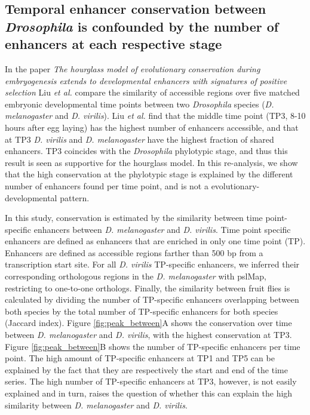 \subsection{Temporal enhancer conservation between \textit{Drosophila} is confounded by the number of enhancers at each respective stage} \label{subsection:liu}

In the paper \textit{The hourglass model of evolutionary conservation during embryogenesis extends to developmental enhancers with signatures of positive selection}\cite{Liu2021} Liu \textit{et al.} compare the similarity of accessible regions over five matched embryonic developmental time points between two \textit{Drosophila} species (\textit{D. melanogaster} and \textit{D. virilis}). Liu \textit{et al.} find that the middle time point (TP3, 8-10 hours after egg laying) has the highest number of enhancers accessible, and that at TP3 \textit{D. virilis} and \textit{D. melanogaster} have the highest fraction of shared enhancers. TP3 coincides with the \textit{Drosophila} phylotypic stage, and thus this result is seen as supportive for the hourglass model. In this re-analysis, we show that the high conservation at the phylotypic stage is explained by the different number of enhancers found per time point, and is not a evolutionary-developmental pattern.

In this study, conservation is estimated by the similarity between time point-specific enhancers between \textit{D. melanogaster} and \textit{D. virilis}. Time point specific enhancers are defined as enhancers that are enriched in only one time point (TP). Enhancers are defined as accessible regions farther than 500 bp from a transcription start site. For all \textit{D. virilis} TP-specific enhancers, we inferred their corresponding orthologous regions in the \textit{D. melanogaster} with pslMap, restricting to one-to-one orthologs. Finally, the similarity between fruit flies is calculated by dividing the number of TP-specific enhancers overlapping between both species by the total number of TP-specific enhancers for both species (Jaccard index). Figure \ref{fig:peak_between}A shows the conservation over time between \textit{D. melanogaster} and \textit{D. virilis}, with the highest conservation at TP3. Figure \ref{fig:peak_between}B shows the number of  TP-specific enhancers per time point. The high amount of TP-specific enhancers at TP1 and TP5 can be explained by the fact that they are respectively the start and end of the time series. The high number
of TP-specific enhancers at TP3, however, is not easily explained and in turn, raises the question of whether this can explain the high similarity between \textit{D. melanogaster} and \textit{D. virilis}.

